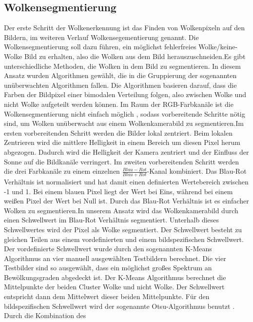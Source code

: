 \documentclass[a4paper,11pt,twoside,german]{article}
\newcommand{\absatz}{\smallbreak}
\begin{document}
\subsection{Wolkensegmentierung}
Der erste Schritt der Wolkenerkennung ist das Finden von Wolkenpixeln auf den
Bildern, im weiteren Verlauf Wolkensegementierung genannt. Die
Wolkensegmentierung soll dazu führen, ein möglichst fehlerfreies
Wolke/keine-Wolke Bild zu erhalten, also die Wolken aus dem Bild
herauszuschneiden.\absatz Es gibt unterschiedliche Methoden, die Wolken in dem
Bild zu segmentieren. In diesem Ansatz wurden Algorithmen gewählt, die in
die Gruppierung der sogenannten unüberwachten Algorithmen fallen. Die
Algorithmen basieren darauf, dass die Farben der Bildpixel einer bimodalen
Verteilung folgen, also zwischen Wolke und nicht Wolke aufgeteilt werden können.
Im Raum der RGB-Farbkanäle ist die Wolkensegmentierung nicht einfach möglich
\citep{dev_14_color}, sodass vorbereitende Schritte nötig sind, um Wolken
unüberwacht aus einem Wolkenkamerabild zu segmentieren.\absatz Im ersten
vorbereitenden Schritt werden die Bilder lokal zentriert. Beim lokalen
Zentrieren wird die mittlere Helligkeit in einem Bereich um diesen Pixel herum
abgezogen. Dadurch wird die Helligkeit der Kamera zentriert und der Einfluss der
Sonne auf die Bildkanäle verringert. Im zweiten vorbereitenden Schritt werden
die drei Farbkanäle zu einem einzelnen $\frac{Blau-Rot}{Blau+Rot}$-Kanal
kombiniert. Das Blau-Rot Verhältnis ist normalisiert und hat damit einen
definierten Wertebereich zwischen -1 und 1. Bei einem blauen Pixel liegt der
Wert bei Eins, während bei einem weißen Pixel der Wert bei Null ist. Durch das
Blau-Rot Verhältnis ist es einfacher Wolken zu segmentieren.\absatz In unserem
Ansatz wird das Wolkenkamerabild durch einen Schwellwert im Blau-Rot Verhältnis
segmentiert. Unterhalb dieses Schwellwertes wird der Pixel als Wolke
segmentiert. Der Schwellwert besteht zu gleichen Teilen aus einem vordefinierten
und einem bildspezifischen Schwellwert. Der vordefinierte Schwellwert wurde
durch den sogenannten K-Means Algorithmus \citep{james_13_introduction} an vier
manuell ausgewählten Testbildern berechnet. Die vier Testbilder sind so
ausgewählt, dass ein möglichst großes Spektrum an Bewölkungsgraden abgedeckt
ist. Der K-Means Algorithmus berechnet die Mittelpunkte der beiden Cluster Wolke
und nicht Wolke. Der Schwellwert entspricht dann dem Mittelwert dieser beiden
Mittelpunkte. Für den bildspezifischen Schwellwert wird der sogenannte
Otsu-Algorithmus benutzt \citep{otsu_75_threshold}. Durch die Kombination des
\end{document}
